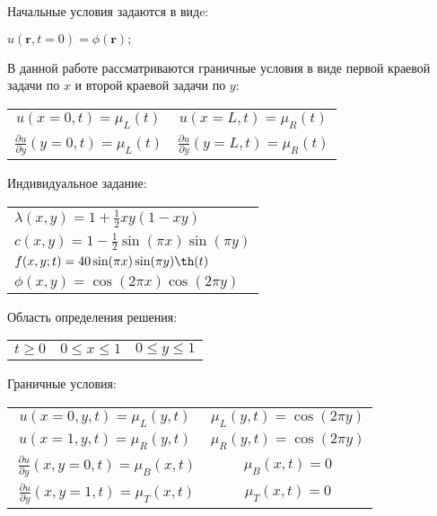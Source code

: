 \documentclass[12pt,a4paper]{article}
\begin{document}
	Начальные условия задаются в видe:\begin{center}$u(\textbf{r}, t = 0) = \phi (\textbf{r});$\end{center}
	В данной работе рассматриваются граничные условия в виде первой краевой задачи по $x$ и второй краевой задачи по $y$:
	\begin{center}
		\begin{tabular}{c c}
			$u(x = 0, t) = \mu_L (t)$&$ u(x = L, t) = \mu_R (t)$ \\
			$\displaystyle \frac{\partial u }{\partial y}(y = 0, t) = \mu_L (t)$&$\displaystyle \frac{\partial u }{\partial y} (y = L, t) = \mu_R (t)$
		\end{tabular}
	\end{center}
	
	
	
	Индивидуальное задание:
	\begin{center}
		\begin{tabular}{l}
			$\lambda (x, y) = 1 + \frac{1}{2} xy(1 - xy)$\\
			$c(x, y) = 1 - \frac{1}{2} \sin(\pi x) \sin(\pi y)$ \\
			$f( x, y; t) = 40 \sin(\pi x) \sin( \pi y) \th(t)$\\
			$\phi( x, y) =  \cos(2\pi x) \cos(2 \pi y) $
		\end{tabular}
	\end{center}
	
	Область определения решения:
	\begin{center}
		\begin{tabular}{c c c }
			$	t \geq 0 $&
			$	0 \leq x \leq 1 $&
			$	0 \leq y \leq 1$
		\end{tabular}
	\end{center}
	Граничные условия:
	\begin{center}
		\begin{tabular}{c c }
			$u(x = 0, y, t) = \mu_L (y, t)$& $\mu_L (y, t) = \cos(2\pi y)$\\
			$u(x = 1, y, t) = \mu_R (y, t)$& $\mu_R (y, t) = \cos(2\pi y)$\\
			$\  \frac{\partial u }{\partial y} (x, y = 0, t) = \mu_B (x, t)$ &$\mu_B (x, t) = 0$\\
			$\  \frac{\partial u }{\partial y} (x, y = 1, t) = \mu_T (x, t)$ &$\mu_T (x, t) = 0$\\
		\end{tabular}
	\end{center}
	
	
	
\end{document}
